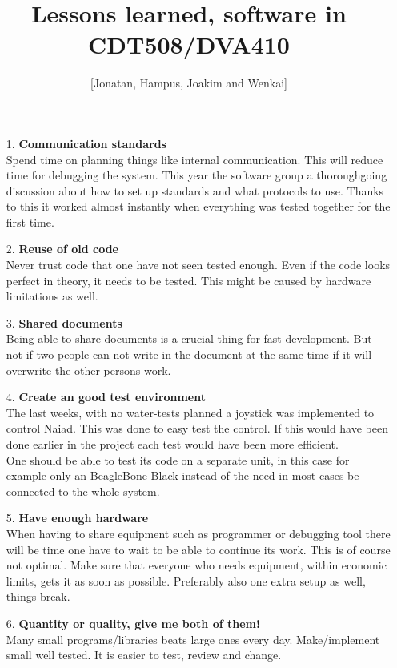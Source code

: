 \documentclass[11pt,a4paper]{amsart}
\title{Lessons learned, software in CDT508/DVA410}
\author{[Jonatan, Hampus, Joakim and Wenkai]}    					%
\begin{document}
\maketitle

\begin{enumerate}
\item[1.]\textbf{Communication standards} \\Spend time on planning things like internal communication. This will reduce time for debugging the system. This year the software group a thoroughgoing discussion about how to set up standards and what protocols to use. Thanks to this it worked almost instantly when everything was tested together for the first time.

\item[2.]\textbf{Reuse of old code} \\Never trust code that one have not seen tested enough. Even if the code looks perfect in theory, it needs to be tested. This might be caused by hardware limitations as well.

\item[3.]\textbf{Shared documents} \\Being able to share documents is a crucial thing for fast development. But not if two people can not write in the document at the same time if it will overwrite the other persons work.

\item[4.]\textbf{Create an good test environment} \\The last weeks, with no water-tests planned a joystick was implemented to control Naiad. This was done to easy test the control. If this would have been done earlier in the project each test would have been more efficient. \\One should be able to test its code on a separate unit, in this case for example only an BeagleBone Black instead of the need in most cases be connected to the whole system.

\item[5.]\textbf{Have enough hardware} \\When having to share equipment such as  programmer or debugging tool there will be time one have to wait to be able to continue its work. This is of course not optimal. Make sure that everyone who needs equipment, within economic limits, gets it as soon as possible. Preferably also one extra setup as well, things break.

\item[6.]\textbf{Quantity or quality, give me both of them!} \\Many small programs/libraries beats large ones every day. Make/implement small well tested. It is easier to test, review and change. 


\end{enumerate}
\end{document}
